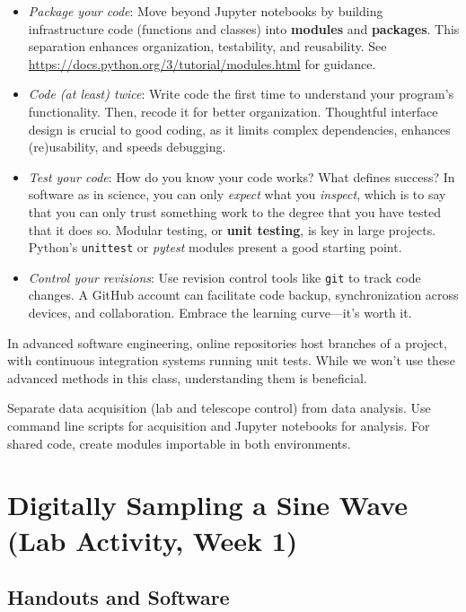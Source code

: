 \documentclass[11pt,preprint]{aastex}
\begin{document}
\begin{itemize}
    \item {\it Package your code}: Move beyond Jupyter notebooks by building infrastructure code (functions and classes) into {\bf modules} and {\bf packages}. This separation enhances organization, testability, and reusability. See \url{https://docs.python.org/3/tutorial/modules.html} for guidance.
    \item {\it Code (at least) twice}: Write code the first time to understand your program's functionality. Then, recode it for better organization. Thoughtful interface design is crucial to good coding, as it limits complex dependencies, enhances (re)usability, and speeds debugging.
    \item {\it Test your code}: How do you know your code works? What defines success?  In software as in science, you can only {\it expect} what you {\it inspect}, which is to say that you can only trust something work to the degree that you have tested that it does so.
Modular testing, or {\bf unit testing}, is key in large projects. Python's {\tt unittest} or {\it pytest} modules present a good starting point.
    \item {\it Control your revisions}: Use revision control tools like {\tt git} to track code changes. A GitHub account can facilitate code backup, synchronization across devices, and collaboration. Embrace the learning curve---it's worth it.
\end{itemize}

\noindent
In advanced software engineering, online repositories host branches of a project, with continuous integration systems running unit tests. While we won't use these advanced methods in this class, understanding them is beneficial.

Separate data acquisition (lab and telescope control) from data analysis. Use command line scripts for acquisition and Jupyter notebooks for analysis. For shared code, create modules importable in both environments.


\section{Digitally Sampling a Sine Wave (Lab Activity, Week 1)}
\label{nyquist}

\subsection{Handouts and Software}
\end{document}
